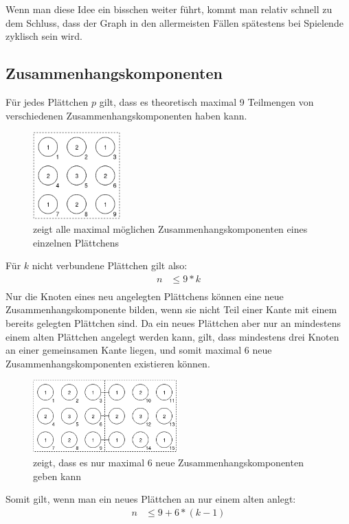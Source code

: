 \documentclass{article}
\begin{document}
Wenn man diese Idee ein bisschen weiter f\"uhrt, kommt man relativ schnell zu dem Schluss, dass der Graph in den allermeisten F\"allen sp\"atestens bei Spielende zyklisch sein wird.

\subsection{Zusammenhangskomponenten}
F\"ur jedes Pl\"attchen $p$ gilt, dass es theoretisch maximal 9 Teilmengen von verschiedenen Zusammenhangskomponenten haben kann.
\begin{figure}[H]
	\centering
	\includegraphics[width=0.3\textwidth]{aufgabe2_0.png}
	\caption{zeigt alle maximal m\"oglichen Zusammenhangskomponenten eines einzelnen Pl\"attchens}
\end{figure}
F\"ur $k$ nicht verbundene Pl\"attchen gilt also:
\begin{align*}
n &\leq 9 * k\\
\end{align*}
Nur die Knoten eines neu angelegten Pl\"attchens k\"onnen eine neue Zusammenhangskomponente bilden, wenn sie nicht Teil einer Kante mit einem bereits gelegten Pl\"attchen sind. Da ein neues Pl\"attchen aber nur an mindestens einem alten Pl\"attchen angelegt werden kann, gilt, dass mindestens drei Knoten an einer gemeinsamen Kante liegen, und somit maximal 6 neue Zusammenhangskomponenten existieren k\"onnen. 
\begin{figure}[H]
	\centering
	\includegraphics[width=0.5\textwidth]{aufgabe2_1.png}
	\caption{zeigt, dass es nur maximal 6 neue Zusammenhangskomponenten geben kann}
\end{figure}
Somit gilt, wenn man ein neues Pl\"attchen an nur einem alten anlegt:
\begin{align*}
n &\leq 9 + 6*(k-1)
\end{align*}
\end{document}
